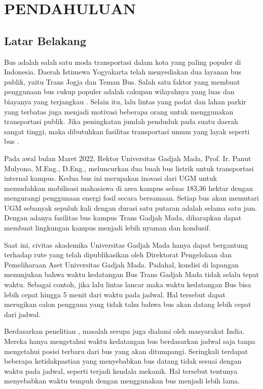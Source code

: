\chapter{PENDAHULUAN}

\section{Latar Belakang}
Bus adalah salah satu moda transportasi dalam kota yang paling populer di Indonesia. Daerah Istimewa Yogyakarta telah menyediakan dua layanan bus publik, yaitu Trans Jogja dan Teman Bus. Salah satu faktor yang membuat penggunaan bus cukup populer adalah cakupan wilayahnya yang luas dan biayanya yang terjangkau \cite{Rohani2013}. Selain itu, lalu lintas yang padat dan lahan parkir yang terbatas juga menjadi motivasi beberapa orang untuk menggunakan transportasi publik. Jika peningkatan jumlah penduduk pada suatu daerah sangat tinggi, maka dibutuhkan fasilitas transportasi umum yang layak seperti bus \cite{Sutandi2015}.

Pada awal bulan Maret 2022, Rektor Universitas Gadjah Mada, Prof. Ir. Panut Mulyono, M.Eng., D.Eng., meluncurkan dua buah bus listrik untuk transportasi internal kampus. Kedua bus ini merupakan inovasi dari UGM untuk memudahkan mobilisasi mahasiswa di area kampus seluas 183,36 hektar dengan mengurangi penggunaan energi fosil secara bersamaan. Setiap bus akan memutari UGM sebanyak sepuluh kali dengan durasi satu putaran adalah selama satu jam. Dengan adanya fasilitas bus kampus Trans Gadjah Mada, diharapkan dapat membuat lingkungan kampus menjadi lebih nyaman dan kondusif.

Saat ini, civitas akademika Universitas Gadjah Mada hanya dapat bergantung terhadap rute yang telah dipublikasikan oleh Direktorat Pengelolaan dan Pemeliharaan Aset Universitas Gadjah Mada. Padahal, kondisi di lapangan menunjukan bahwa waktu kedatangan Bus Trans Gadjah Mada tidak selalu tepat waktu. Sebagai contoh, jika lalu lintas lancar maka waktu kedatangan Bus bisa lebih cepat hingga 5 menit dari waktu pada jadwal. Hal tersebut dapat merugikan calon pengguna yang tidak tahu bahwa bus akan datang lebih cepat dari jadwal.

Berdasarkan penelitian \cite{Sutar2016}, masalah serupa juga dialami oleh masyarakat India. Mereka hanya mengetahui waktu kedatangan bus berdasarkan jadwal saja tanpa mengetahui posisi terbaru dari bus yang akan ditumpangi. Seringkali terdapat beberapa ketidakpastian yang menyebabkan bus datang tidak sesuai dengan waktu pada jadwal, seperti terjadi kendala mekanik. Hal tersebut tentunya menyebabkan waktu tempuh dengan menggunakan bus menjadi lebih lama.

